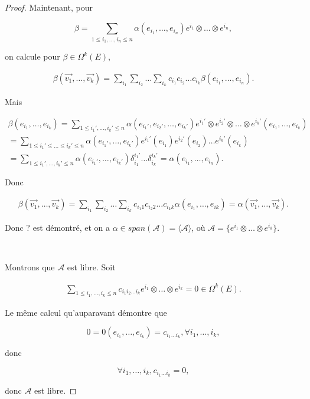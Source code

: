\documentclass[french]{article}
\begin{document}
\begin{proof}
  Maintenant, pour

  \[
  \beta = \sum_{1 \leq i_1, \dots, i_n \leq n}^{} \alpha(e_{i_1}, \dots,  e_{i_n}) e ^{i_1}\otimes \dots \otimes e ^{i_n},
  \]

  on calcule pour $\beta  \in \Omega ^{k}(E)$,

  \begin{gather*}
    \beta (\overrightarrow{ v_1 }, \dots, \overrightarrow{ v_k })= \sum_{i_1}^{} \sum_{i_2}^{} \dots \sum_{i_k}^{} c _{i_1} c _{i_2} \dots c _{i_k} \beta(e _{i_1}, \dots, e _{i_n}).
  \end{gather*}

  Mais

  \begin{gather*}
    \beta (e _{i_1}, \dots, e _{i_k}) = \sum_{1 \leq i_1', \dots, i_k' \leq n}^{} \alpha( e _{i_1'}, e _{i_2'}, \dots, e _{i_k'}) e ^{i_1'}\otimes e ^{i_2'} \otimes \dots \otimes e ^{i_k'} (e_{i_1},\dots, e_{i_k}) \\
    = \sum_{1 \leq i_1' \leq \dots \leq i_k' \leq n}^{} \alpha(e _{i_1'}, \dots, e _{i_k'}) e ^{i_1'}(e _{i_1}) e ^{i_2'}(e _{i_2}) \dots e ^{i_k'} (e _{i_k}) \\
    =\sum_{1 \leq i_1', \dots, i_k' \leq n}^{} \alpha(e _{i_1'}, \dots, e _{i_k'}) \delta _{i_1} ^{i_1'} \dots \delta _{i_k} ^{i_k'} = \alpha(e _{i_1}, \dots, e _{i_n}).
  \end{gather*}

  Donc

  \begin{gather*}
    \beta (\overrightarrow{ v_1 }, \dots, \overrightarrow{ v_k }  ) = \sum_{i_1}^{} \sum_{i_2}^{} \dots \sum_{i_k}^{} c _{i_1 1} c _{i_2 2} \dots c _{i_k k} \alpha(e _{i_1}, \dots, e _{ik}) = \alpha(\overrightarrow{ v_1 }, \dots, \overrightarrow{ v_k }  )   .
  \end{gather*}

  Donc ? est démontré, et on a $\alpha \in span(\mathscr{A} ) = \langle \mathscr{A} \rangle $, où $\mathscr{A} = \{ e ^{i_1} \otimes \dots \otimes e ^{i_k}\} $.

  \

  Montrons que $\mathscr{A} $ est libre. Soit

  \begin{gather*}
    \sum_{1 \leq i_1 , \dots, i_k \leq n}^{} c _{i_1 i_2 \dots i_k}  e ^{i_1} \otimes \dots \otimes e ^{i_k} = 0 \in \Omega ^{k}(E).
  \end{gather*}

  Le même calcul qu'auparavant démontre que

  \[
  0 = 0(e _{i_1}, \dots, e _{i_k}) = c _{i_1 \dots i_k}, \forall i_1, \dots, i_k,
  \]

  donc

  \[
  \forall i_1, \dots, i_k, c _{i_1 \dots i_k} =0,
  \]

  donc $\mathscr{A} $ est libre.
\end{proof}
\end{document}
